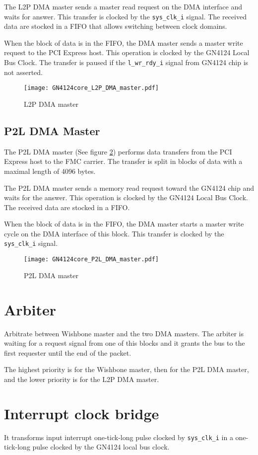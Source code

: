 \documentclass[10pt,a4paper]{cerndoc}
\begin{document}
The L2P DMA master sends a master read request on the DMA interface and waits for answer. This transfer is clocked by the \verb+sys_clk_i+ signal. The received data are stocked in a FIFO that allows switching between clock domains.

When the block of data is in the FIFO, the DMA master sends a master write request to the PCI Express host. This operation is clocked by the GN4124 Local Bus Clock. The transfer is paused if the \verb+l_wr_rdy_i+ signal from GN4124 chip is not asserted.



\begin{figure}[!ht]
	\centering
		\texttt{[image: GN4124core\_L2P\_DMA\_master.pdf]}
	\caption{L2P DMA master}
	\label{fig:GN4124core_l2p_dma_master}
\end{figure}

 \subsection{P2L DMA Master}
The P2L DMA master (See figure \ref{fig:GN4124core_p2l_dma_master}) performs data transfers from the PCI Express host to the FMC carrier. The transfer is split in blocks of data with a maximal length of 4096 bytes.

The P2L DMA master sends a memory read request toward the GN4124 chip and waits for the answer. This operation is clocked by the GN4124 Local Bus Clock. The received data are stocked in a FIFO. 

When the block of data is in the FIFO, the DMA master starts a master write cycle on the DMA interface of this block. This transfer is clocked by the \verb+sys_clk_i+ signal. 

  \begin{figure}[!ht]
	\centering
		\texttt{[image: GN4124core\_P2L\_DMA\_master.pdf]}
	\caption{P2L DMA master}
	\label{fig:GN4124core_p2l_dma_master}
\end{figure}

 \section{Arbiter}
Arbitrate between Wishbone master and the two DMA masters. The arbiter is waiting for a request signal from one of this blocks and it grants the bus to the first requester until the end of the packet.

The highest priority is for the Wishbone master, then for the P2L DMA master, and the lower priority is for the L2P DMA master.

  \section{Interrupt clock bridge}
  It transforms input interrupt one-tick-long pulse clocked by \verb+sys_clk_i+ in a one-tick-long pulse clocked by the GN4124 local bus clock.
\end{document}
